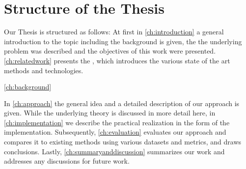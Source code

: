 \section{Structure of the Thesis}
\label{sec:structure_of_thesis}


Our Thesis is structured as follows:
At first in \autoref{ch:introduction} a general introduction to the topic including the background is given, the 
the underlying problem was described and the objectives of this work were presented.
\autoref{ch:relatedwork} presents the , which introduces the various state of the art methods and technologies. 

\autoref{ch:background}

In \autoref{ch:approach} the general idea and a detailed description of our approach is given.
While the underlying theory is discussed in more detail here, in \autoref{ch:implementation} we describe the practical realization in the form of the implementation.
Subsequently, \autoref{ch:evaluation} evaluates our approach and compares it to existing methods using various datasets and metrics, and draws conclusions.
Lastly, \autoref{ch:summaryanddiscussion} summarizes our work and addresses any discussions for future work.